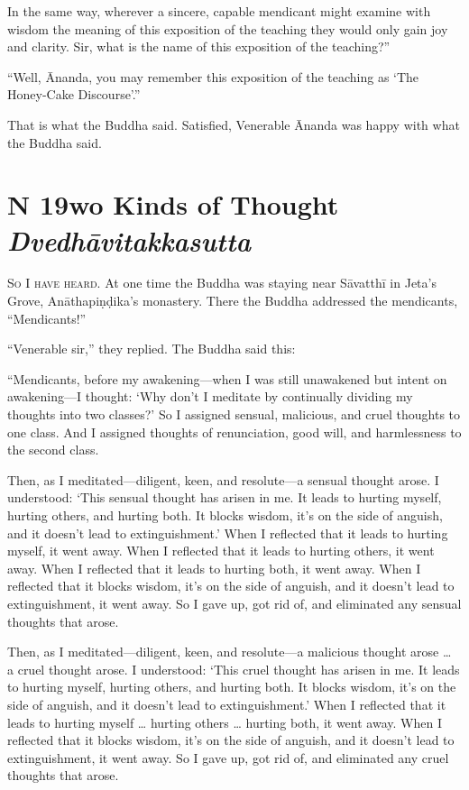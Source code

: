 \documentclass[12pt,openany]{book}%
\newcommand*{\suttatitleacronym}[1]{\smaller[2]{#1}\vspace*{.3em}}
\newcommand*{\suttatitletranslation}[1]{\linebreak{#1}}
\newcommand*{\suttatitleroot}[1]{\linebreak\smaller[2]\itshape{#1}}
\newcommand*{\tocacronym}[1]{\hspace*{-3.3em}{#1}\quad}
\newcommand*{\toctranslation}[1]{#1}
\newcommand*{\tocroot}[1]{(\textit{#1})}
\newcommand*{\scevam}[1]{\textsc{#1}}
\begin{document}
In the same way, wherever a sincere, capable mendicant might examine with wisdom the meaning of this exposition of the teaching they would only gain joy and clarity. Sir, what is the name of this exposition of the teaching?” 

“Well, Ānanda, you may remember this exposition of the teaching as ‘The Honey-Cake Discourse’.” 

That is what the Buddha said. Satisfied, Venerable Ānanda was happy with what the Buddha said. 

%
\section*{{\suttatitleacronym MN 19}{\suttatitletranslation Two Kinds of Thought }{\suttatitleroot Dvedhāvitakkasutta}}
\addcontentsline{toc}{section}{\tocacronym{MN 19} \toctranslation{Two Kinds of Thought } \tocroot{Dvedhāvitakkasutta}}

\scevam{So I have heard. }At one time the Buddha was staying near \textsanskrit{Sāvatthī} in Jeta’s Grove, \textsanskrit{Anāthapiṇḍika}’s monastery. There the Buddha addressed the mendicants, “Mendicants!” 

“Venerable sir,” they replied. The Buddha said this: 

“Mendicants, before my awakening—when I was still unawakened but intent on awakening—I thought: ‘Why don’t I meditate by continually dividing my thoughts into two classes?’ So I assigned sensual, malicious, and cruel thoughts to one class. And I assigned thoughts of renunciation, good will, and harmlessness to the second class. 

Then, as I meditated—diligent, keen, and resolute—a sensual thought arose. I understood: ‘This sensual thought has arisen in me. It leads to hurting myself, hurting others, and hurting both. It blocks wisdom, it’s on the side of anguish, and it doesn’t lead to extinguishment.’ When I reflected that it leads to hurting myself, it went away. When I reflected that it leads to hurting others, it went away. When I reflected that it leads to hurting both, it went away. When I reflected that it blocks wisdom, it’s on the side of anguish, and it doesn’t lead to extinguishment, it went away. So I gave up, got rid of, and eliminated any sensual thoughts that arose. 

Then, as I meditated—diligent, keen, and resolute—a malicious thought arose … a cruel thought arose. I understood: ‘This cruel thought has arisen in me. It leads to hurting myself, hurting others, and hurting both. It blocks wisdom, it’s on the side of anguish, and it doesn’t lead to extinguishment.’ When I reflected that it leads to hurting myself … hurting others … hurting both, it went away. When I reflected that it blocks wisdom, it’s on the side of anguish, and it doesn’t lead to extinguishment, it went away. So I gave up, got rid of, and eliminated any cruel thoughts that arose. 
\end{document}
